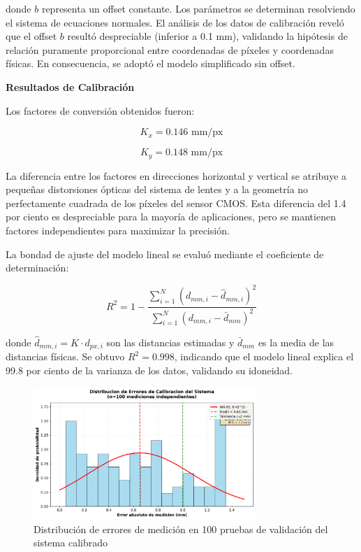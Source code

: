 donde $b$ representa un offset constante. Los parámetros se determinan resolviendo el sistema de ecuaciones normales. El análisis de los datos de calibración reveló que el offset $b$ resultó despreciable (inferior a 0.1 mm), validando la hipótesis de relación puramente proporcional entre coordenadas de píxeles y coordenadas físicas. En consecuencia, se adoptó el modelo simplificado sin offset.

\textbf{Resultados de Calibración}

Los factores de conversión obtenidos fueron:

\begin{equation}
K_x = 0.146 \text{ mm/px}
\end{equation}

\begin{equation}
K_y = 0.148 \text{ mm/px}
\end{equation}

La diferencia entre los factores en direcciones horizontal y vertical se atribuye a pequeñas distorsiones ópticas del sistema de lentes y a la geometría no perfectamente cuadrada de los píxeles del sensor CMOS. Esta diferencia del 1.4 por ciento es despreciable para la mayoría de aplicaciones, pero se mantienen factores independientes para maximizar la precisión.

La bondad de ajuste del modelo lineal se evaluó mediante el coeficiente de determinación:

\begin{equation}
R^2 = 1 - \frac{\sum_{i=1}^{N}(d_{mm,i} - \hat{d}_{mm,i})^2}{\sum_{i=1}^{N}(d_{mm,i} - \bar{d}_{mm})^2}
\end{equation}

donde $\hat{d}_{mm,i} = K \cdot d_{px,i}$ son las distancias estimadas y $\bar{d}_{mm}$ es la media de las distancias físicas. Se obtuvo $R^2 = 0.998$, indicando que el modelo lineal explica el 99.8 por ciento de la varianza de los datos, validando su idoneidad.

\begin{figure}[h]
\centering
\includegraphics[width=0.75\textwidth]{imagenes/distribucion_errores_calibracion.png}
\caption{Distribución de errores de medición en 100 pruebas de validación del sistema calibrado}
\label{fig:distribucion_errores}
\end{figure}

